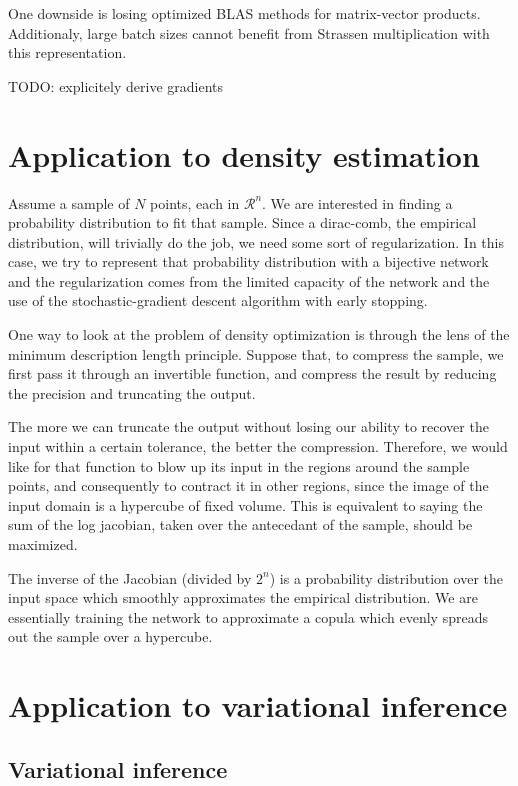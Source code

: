 \documentclass{article}
\begin{document}
One downside is losing optimized BLAS methods for matrix-vector products.
Additionaly, large batch sizes cannot benefit from Strassen multiplication
with this representation.


TODO: explicitely derive gradients

\section{Application to density estimation}

Assume a sample of \(N\) points, each in \(\mathcal{R}^n\). We are interested in
finding a probability distribution to fit that sample. Since a dirac-comb,
the empirical distribution, will trivially do the job, we need some sort of
regularization. In this case, we try to represent that probability distribution
with a bijective network and the regularization comes from the limited
capacity of the network and the use of the stochastic-gradient descent
algorithm with early stopping.

One way to look at the problem of density optimization is through the lens of
the minimum description length principle. Suppose that, to compress the
sample, we first pass it through an invertible function, and compress the
result by reducing the precision and truncating the output.

The more we can truncate the output without losing our ability to recover the
input within a certain tolerance, the better the compression.
Therefore, we would like for that function to blow up its input in the
regions around the sample points, and consequently to contract it in other
regions, since the image of the input domain is a hypercube of fixed volume.
This is equivalent to saying the sum of the log jacobian, taken over the
antecedant of the sample, should be maximized.

The inverse of the Jacobian (divided by \(2^n\)) is a probability distribution
over the input space which smoothly approximates the empirical distribution.
We are essentially training the network to approximate a copula which evenly
spreads out the sample over a hypercube.

\section{Application to variational inference}

\subsection{Variational inference}
\end{document}
